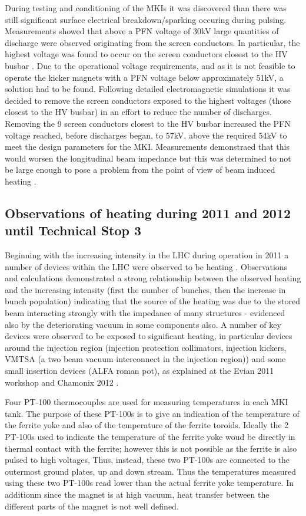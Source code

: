 During testing and conditioning of the MKIs it was discovered than there was still significant surface electrical breakdown/sparking occuring during pulsing. Measurements showed that above a PFN voltage of 30kV large quantities of discharge were observed originating from the screen conductors. In particular, the highest voltage was found to occur on the screen conductors closest to the HV busbar \cite{Barnes:improvBeamScreen}. Due to the operational voltage requirements, and as it is not feasible to operate the kicker magnets with a PFN voltage below approximately 51kV, a solution had to be found. Following detailed electromagnetic simulations it was decided to remove the screen conductors exposed to the highest voltages (those closest to the HV busbar) in an effort to reduce the number of discharges. Removing the 9 screen conductors closest to the HV busbar increased the PFN voltage reached, before discharges began, to 57kV, above the required 54kV to meet the design parameters for the MKI. Measurements demonstraed that this would worsen the longitudinal beam impedance but this was determined to not be large enough to pose a problem from the point of view of beam induced heating \cite{Barnes:improvBeamScreen}.

\subsection{Observations of heating during 2011 and 2012 until Technical Stop 3}

Beginning with the increasing intensity in the LHC during operation in 2011 a number of devices within the LHC were observed to be heating \cite{ Salvant:Heating, Metral:Heating}. Observations and calculations demonstrated a strong relationship between the observed heating and the increasing intensity (first the number of bunches, then the increase in bunch population) indicating that the source of the heating was due to the stored beam interacting strongly with the impedance of many structures - evidenced also by the deteriorating vacuum in some components also. A number of key devices were observed to be exposed to significant heating, in particular devices around the injection region (injection protection collimators, injection kickers, VMTSA (a two beam vacuum interconnect in the injection region)) and some small insertion devices (ALFA roman pot), as explained at the Evian 2011 workshop \cite{Salvant:Heating} and Chamonix 2012 \cite{Metral:Heating}. 

Four PT-100 thermocouples are used for measuring temperatures in each MKI tank. The purpose of these PT-100s is to give an indication of the temperature of the ferrite yoke and also of the temperature of the ferrite toroids. Ideally the 2 PT-100s used to indicate the temperature of the ferrite yoke woud be directly in thermal contact with the ferrite; however this is not possible as the ferrite is also pulsed to high voltages, Thus, instead, these two PT-100s are connected to the outermost ground plates, up and down stream. Thus the temperatures measured using these two PT-100s read lower than the actual ferrite yoke temperature. In additionm since the magnet is at high vacuum, heat transfer between the different parts of the magnet is not well defined.

